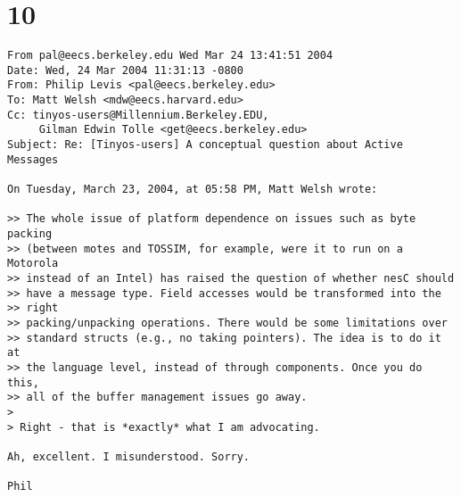 \documentclass[10pt]{article}
\begin{document}
\section*{10}

\begin{verbatim}
From pal@eecs.berkeley.edu Wed Mar 24 13:41:51 2004
Date: Wed, 24 Mar 2004 11:31:13 -0800
From: Philip Levis <pal@eecs.berkeley.edu>
To: Matt Welsh <mdw@eecs.harvard.edu>
Cc: tinyos-users@Millennium.Berkeley.EDU,
     Gilman Edwin Tolle <get@eecs.berkeley.edu>
Subject: Re: [Tinyos-users] A conceptual question about Active Messages

On Tuesday, March 23, 2004, at 05:58 PM, Matt Welsh wrote:

>> The whole issue of platform dependence on issues such as byte packing
>> (between motes and TOSSIM, for example, were it to run on a Motorola
>> instead of an Intel) has raised the question of whether nesC should
>> have a message type. Field accesses would be transformed into the 
>> right
>> packing/unpacking operations. There would be some limitations over
>> standard structs (e.g., no taking pointers). The idea is to do it at
>> the language level, instead of through components. Once you do this,
>> all of the buffer management issues go away.
>
> Right - that is *exactly* what I am advocating.

Ah, excellent. I misunderstood. Sorry.

Phil

\end{verbatim}
\end{document}
